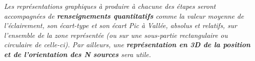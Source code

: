 \documentclass[10pt]{article} %
\def\dirName{6N-ONIP-bloc4_intro}
\begin{document}
\begin{minipage}[t]{.30\linewidth} %


\hfill


\end{minipage} %

\newpage

\hypertarget{stepbystep}{}

\textit{Les représentations graphiques à produire à chacune des étapes seront accompagnées de \textbf{renseignements quantitatifs} comme la valeur moyenne de l'éclairement, son écart-type et son écart Pic à Vallée, absolus et relatifs, sur l'ensemble de la zone représentée (ou sur une sous-partie rectangulaire ou circulaire de celle-ci). Par ailleurs, une \textbf{représentation en 3D de la position et de l'orientation des N sources} sera utile.}

\qquad

\qquad
\end{document}
